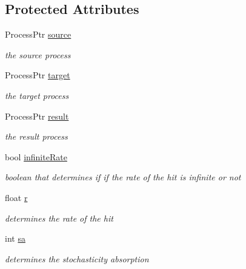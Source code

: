 \subsection*{\-Protected \-Attributes}
\begin{DoxyCompactItemize}
\item 
\hypertarget{class_action_a3c09a49605fcc2f51ee6eb792f7bb9b4}{\-Process\-Ptr \hyperlink{class_action_a3c09a49605fcc2f51ee6eb792f7bb9b4}{source}}\label{class_action_a3c09a49605fcc2f51ee6eb792f7bb9b4}

\begin{DoxyCompactList}\small\item\em the source process \end{DoxyCompactList}\item 
\hypertarget{class_action_ac77168b4d172cfc7238cfbb422fa4a98}{\-Process\-Ptr \hyperlink{class_action_ac77168b4d172cfc7238cfbb422fa4a98}{target}}\label{class_action_ac77168b4d172cfc7238cfbb422fa4a98}

\begin{DoxyCompactList}\small\item\em the target process \end{DoxyCompactList}\item 
\hypertarget{class_action_a5896c6900916d296ed4220063f24b78d}{\-Process\-Ptr \hyperlink{class_action_a5896c6900916d296ed4220063f24b78d}{result}}\label{class_action_a5896c6900916d296ed4220063f24b78d}

\begin{DoxyCompactList}\small\item\em the result process \end{DoxyCompactList}\item 
\hypertarget{class_action_a5107742916f82d9f529f17606ad5ab74}{bool \hyperlink{class_action_a5107742916f82d9f529f17606ad5ab74}{infinite\-Rate}}\label{class_action_a5107742916f82d9f529f17606ad5ab74}

\begin{DoxyCompactList}\small\item\em boolean that determines if if the rate of the hit is infinite or not \end{DoxyCompactList}\item 
\hypertarget{class_action_a87bdc737d9edb523ec57adb27adec6b6}{float \hyperlink{class_action_a87bdc737d9edb523ec57adb27adec6b6}{r}}\label{class_action_a87bdc737d9edb523ec57adb27adec6b6}

\begin{DoxyCompactList}\small\item\em determines the rate of the hit \end{DoxyCompactList}\item 
\hypertarget{class_action_a5832a567f356f72e4767d84ad6a6212a}{int \hyperlink{class_action_a5832a567f356f72e4767d84ad6a6212a}{sa}}\label{class_action_a5832a567f356f72e4767d84ad6a6212a}

\begin{DoxyCompactList}\small\item\em determines the stochasticity absorption \end{DoxyCompactList}\end{DoxyCompactItemize}


